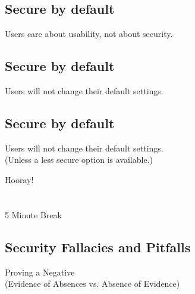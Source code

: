 \documentclass[xga]{xdvislides}
\begin{document}
\subsection{Secure by default}
\vspace{.5in}
\Huge
\begin{center}
Users care about usability, not about security.
\end{center}
\Normalsize

\subsection{Secure by default}
\vspace{.5in}
\Huge
\begin{center}
Users will not change their default settings.
\end{center}
\Normalsize

\subsection{Secure by default}
\vspace{.5in}
\Huge
\begin{center}
Users will not change their default settings. \\
\Normalsize
(Unless a less secure option is available.)
\end{center}

\newpage
\vspace*{\fill}
\begin{center}
    \Hugesize
        Hooray! \\ [1em]
    \hspace*{5mm}
    \blueline\\
    \hspace*{5mm}\\
        5 Minute Break
\end{center}
\vspace*{\fill}

\subsection{Security Fallacies and Pitfalls}
\vspace*{\fill}
\begin{center}
    \Hugesize
        Proving a Negative \\
	\vspace{.25in}
	\Normalsize
	(Evidence of Absences vs. Absence of Evidence)
\end{center}
\vspace*{\fill}
\end{document}
